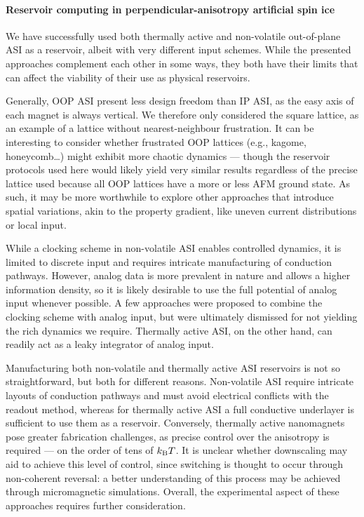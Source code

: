 \paragraph{Reservoir computing in perpendicular-anisotropy artificial spin ice}
We have successfully used both thermally active and non-volatile out-of-plane ASI as a reservoir, albeit with very different input schemes.
While the presented approaches complement each other in some ways, they both have their limits that can affect the viability of their use as physical reservoirs. \\\par

Generally, OOP ASI present less design freedom than IP ASI, as the easy axis of each magnet is always vertical.
We therefore only considered the square lattice, as an example of a lattice without nearest-neighbour frustration.
It can be interesting to consider whether frustrated OOP lattices (e.g., kagome, honeycomb\dots) might exhibit more chaotic dynamics --- though the reservoir protocols used here would likely yield very similar results regardless of the precise lattice used because all OOP lattices have a more or less AFM ground state.
As such, it may be more worthwhile to explore other approaches that introduce spatial variations, akin to the property gradient, like uneven current distributions or local input. \\\par

While a clocking scheme in non-volatile ASI enables controlled dynamics, it is limited to discrete input and requires intricate manufacturing of conduction pathways.
However, analog data is more prevalent in nature and allows a higher information density, so it is likely desirable to use the full potential of analog input whenever possible.
A few approaches were proposed to combine the clocking scheme with analog input, but were ultimately dismissed for not yielding the rich dynamics we require.
Thermally active ASI, on the other hand, can readily act as a leaky integrator of analog input. \par
Manufacturing both non-volatile and thermally active ASI reservoirs is not so straightforward, but both for different reasons.
Non-volatile ASI require intricate layouts of conduction pathways and must avoid electrical conflicts with the readout method, whereas for thermally active ASI a full conductive underlayer is sufficient to use them as a reservoir.
Conversely, thermally active nanomagnets pose greater fabrication challenges, as precise control over the anisotropy is required --- on the order of tens of $\kBT$.
It is unclear whether downscaling may aid to achieve this level of control, since switching is thought to occur through non-coherent reversal: a better understanding of this process may be achieved through micromagnetic simulations.
Overall, the experimental aspect of these approaches requires further consideration. \\\par

